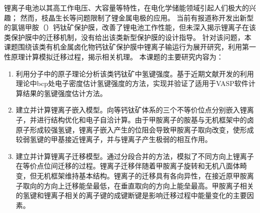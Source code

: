 
\begin{cabstract}

锂离子电池以其高工作电压、大容量等特性，在电化学储能领域引起人们极大的兴趣；
然而，枝晶生长等问题限制了锂金属电极的应用。
当前有报道称开发出新型的氯锡甲胺（）钙钛矿保护膜，改善了锂电池工作性能，但未深入揭示锂离子在该类保护膜中的迁移机制，没有给出该类新型保护膜的设计指导。
针对该问题，本课题围绕该类有机金属卤化物钙钛矿保护膜中锂离子输运行为展开研究，利用第一性原理计算模拟迁移过程，揭示相关机理。
本课题的主要研究内容为：
\begin{enumerate}
    \item 利用分子中的原子理论分析该类钙钛矿中氢键强度。基于近期文献开发的利用理论中bcp处电子密度估计氢键强度的方法，实现并验证了适用于VASP软件计算结果的氢键强度估计方法。
    \item 建立并计算锂离子嵌入模型。向等钙钛矿体系的三个不等价位点分别嵌入锂离子，并进行结构优化和电子自洽计算。由于甲胺离子的胺基与无机框架中的卤原子形成较强氢键，锂离子嵌入产生的位阻会导致甲胺离子取向改变，使形成较弱氢键的甲基接近锂离子，并与锂离子产生极弱的相互作用。
    \item 建立并计算锂离子迁移模型。通过分段合并的方法，模拟了不同方向上锂离子在等价点位间迁移的过程。锂离子迁移伴随着甲胺离子旋转和无机八面体畸变，但无机框架维持基本结构。锂离子的迁移具有各向异性，在接近原甲胺离子取向的方向上迁移能垒最低，在垂直取向的方向上能垒最高。甲胺离子相关的氢键和锂离子相关的离子键的成键断键是影响迁移过程中能量变化的主要因素。
\end{enumerate}

\end{cabstract}

